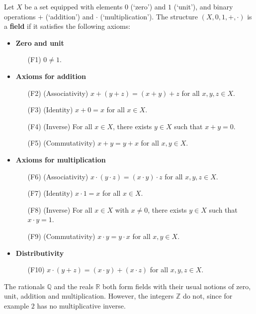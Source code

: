 \begin{axioms}
\label{axField}
Let $X$ be a set equipped with elements $0$ (`zero') and $1$ (`unit'), and binary operations $+$ (`addition') and $\cdot$ (`multiplication'). The structure $(X,0,1,+,{\cdot})$ is a \textbf{field} if it satisfies the following axioms:
\begin{itemize}
\item \textbf{Zero and unit}
\begin{itemize}[leftmargin=30pt]
\item[(F1)] $0 \ne 1$.
\end{itemize}
\item \textbf{Axioms for addition}
\begin{itemize}
\item[(F2)] (Associativity) $x+(y+z) = (x+y)+z$ for all $x,y,z \in X$.
\item[(F3)] (Identity) $x+0=x$ for all $x \in X$.
\item[(F4)] (Inverse) For all $x \in X$, there exists $y \in X$ such that $x+y=0$.
\item[(F5)] (Commutativity) $x+y=y+x$ for all $x,y \in X$.
\end{itemize}
\item \textbf{Axioms for multiplication}
\begin{itemize}[leftmargin=30pt]
\item[(F6)] (Associativity) $x \cdot (y \cdot z) = (x \cdot y) \cdot z$ for all $x,y,z \in X$.
\item[(F7)] (Identity) $x \cdot 1 = x$ for all $x \in X$.
\item[(F8)] (Inverse) For all $x \in X$ with $x \ne 0$, there exists $y \in X$ such that $x \cdot y = 1$.
\item[(F9)] (Commutativity) $x \cdot y = y \cdot x$ for all $x,y \in X$.
\end{itemize}
\item \textbf{Distributivity}
\begin{itemize}[leftmargin=30pt]
\item[(F10)] $x \cdot (y + z) = (x \cdot y) + (x \cdot z)$ for all $x,y,z \in X$.
\end{itemize}
\end{itemize}
\end{axioms}

\begin{example}
The rationals $\mathbb{Q}$ and the reals $\mathbb{R}$ both form fields with their usual notions of zero, unit, addition and multiplication. However, the integers $\mathbb{Z}$ do not, since for example $2$ has no multiplicative inverse.
\end{example}

